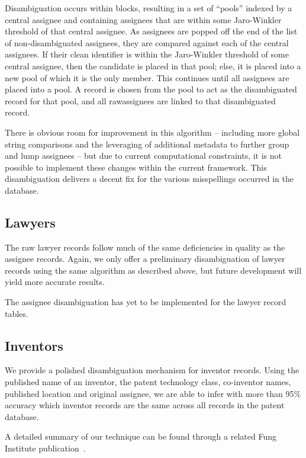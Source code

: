 Disambiguation occurs within blocks, resulting in a set of ``pools'' indexed by
a central assignee and containing assignees that are within some Jaro-Winkler
threshold of that central assignee. As assignees are popped off the end of the
list of non-disambiguated assignees, they are compared against each of the
central assignees. If their clean identifier is within the Jaro-Winkler
threshold of some central assignee, then the candidate is placed in that pool;
else, it is placed into a new pool of which it is the only member. This
continues until all assignees are placed into a pool. A record is chosen from
the pool to act as the disambiguated record for that pool, and all rawassignees
are linked to that disambiguated record.

There is obvious room for improvement in this algorithm -- including more
global string comparisons and the leveraging of additional metadata to
further group and lump assignees -- but due to current computational
constraints, it is not possible to implement these changes within the current
framework. This disambiguation delivers a decent fix for the various misspellings
occurred in the database.

\subsection{Lawyers}

The raw lawyer records follow much of the same deficiencies in quality
as the assignee records. Again, we only offer a preliminary disambiguation
of lawyer records using the same algorithm as described above, but
future development will yield more accurate results.

The assignee disambiguation has yet to be implemented for the lawyer
record tables.

\subsection{Inventors}

We provide a polished disambiguation mechanism for inventor records.
Using the published name of an inventor, the patent technology class,
co-inventor names, published location and original assignee, we are
able to infer with more than 95\% accuracy which inventor records
are the same across all records in the patent database.

A detailed summary of our technique can be found through a related
Fung Institute publication~\cite{newdisambiguation}.

